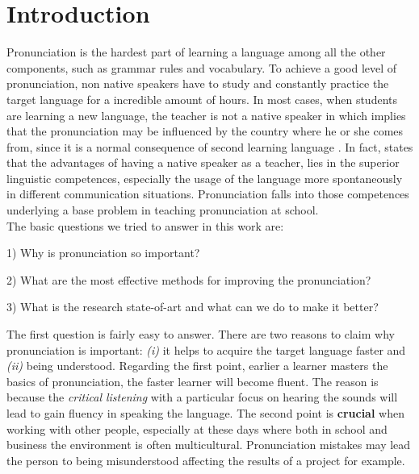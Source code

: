 \chapter{Introduction}
\label{ch:introduction}
Pronunciation is the hardest part of learning a language among all the other components, such as grammar rules and vocabulary. To achieve a good level of pronunciation, non native speakers have to study and constantly practice the target language for a incredible amount of hours. In most cases, when students are learning a new language, the teacher is not a native speaker in which implies that the pronunciation may be influenced by the country where he or she comes from, since it is a normal consequence of second learning language \cite{derwing2005second}. In fact, \cite{medgyes2001teacher} states that the advantages of having a native speaker as a teacher, lies in the superior linguistic competences, especially the usage of the language more spontaneously in different communication situations. Pronunciation falls into those competences underlying a base problem in teaching pronunciation at school. \\
\noindent The basic questions we tried to answer in this work are:
\begin{compactitem}
    \item[1)] Why is pronunciation so important?
    \item[2)] What are the most effective methods for improving the pronunciation?
    \item[3)] What is the research state-of-art and what can we do to make it better?
\end{compactitem}

\vspace*{1em}

\noindent The first question is fairly easy to answer. There are two reasons to claim why pronunciation is important: \textit{(i)} it helps to acquire the target language faster and \textit{(ii)} being understood.
Regarding the first point, earlier a learner masters the basics of pronunciation, the faster learner will become fluent. The reason is because the \textit{critical listening} with a particular focus on hearing the sounds will lead to gain fluency in speaking the language.
The second point is \textbf{crucial} when working with other people, especially at these days where both in school and business the environment is often multicultural. Pronunciation mistakes may lead the person to being misunderstood affecting the results of a project for example. \\

